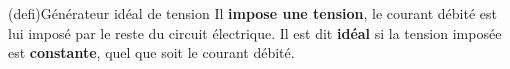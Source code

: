 \documentclass[../../main/main.tex]{subfiles}
\begin{document}
\begin{tcb*}[label=def:gentens, sidebyside, righthand ratio=.2](defi){Générateur
			idéal de tension}
	Il \textbf{impose une tension}, le courant débité est lui imposé par le reste
	du circuit électrique. Il est dit \textbf{idéal} si la tension imposée est
	\textbf{constante}, quel que soit le courant débité.
	\tcblower
	\begin{center}
	\end{center}
\end{tcb*}
\end{document}
